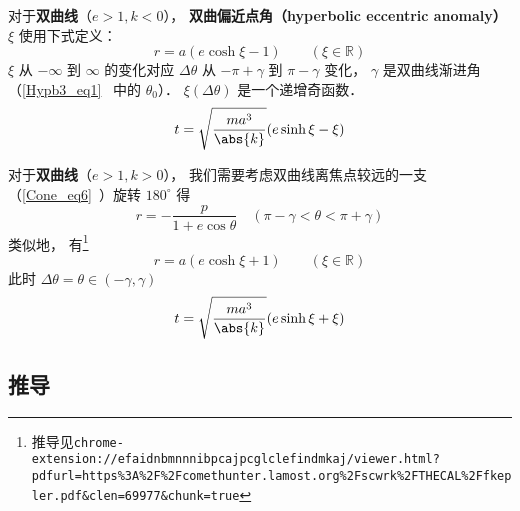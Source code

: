 对于\textbf{双曲线}（$e>1, k<0$）， \textbf{双曲偏近点角（hyperbolic eccentric anomaly）} $\xi$ 使用下式定义：
\begin{equation}\label{EqMoKp_eq2} %
r = a(e\cosh\xi - 1) \qquad (\xi \in \mathbb R)
\end{equation}
$\xi$ 从 $-\infty$ 到 $\infty$ 的变化对应 $\Delta\theta$ 从 $-\pi+\gamma$ 到 $\pi-\gamma$ 变化， $\gamma$ 是双曲线渐进角（\autoref{Hypb3_eq1}~ 中的 $\theta_0$）． $\xi(\Delta\theta)$ 是一个递增奇函数．
\begin{equation}\label{EqMoKp_eq4} %
t = \sqrt{\frac{ma^3}{\abs{k}}} (e\sinh\xi - \xi)
\end{equation}

对于\textbf{双曲线}（$e>1, k>0$）， 我们需要考虑双曲线离焦点较远的一支（\autoref{Cone_eq6}~）旋转 $180^\circ$ 得
\begin{equation} %
r = -\frac{p}{1 + e\cos\theta} \quad (\pi-\gamma<\theta<\pi+\gamma)
\end{equation}
类似地， 有\footnote{推导见\lstinline|chrome-extension://efaidnbmnnnibpcajpcglclefindmkaj/viewer.html?pdfurl=https%3A%2F%2Fcomethunter.lamost.org%2Fscwrk%2FTHECAL%2Ffkepler.pdf&clen=69977&chunk=true|}
\begin{equation} %
r = a(e\cosh\xi + 1) \qquad (\xi \in \mathbb R)
\end{equation}
此时 $\Delta\theta = \theta \in (-\gamma, \gamma)$
\begin{equation}\label{EqMoKp_eq6} %
t = \sqrt{\frac{ma^3}{\abs{k}}} (e\sinh\xi + \xi)
\end{equation}

\subsection{推导}
